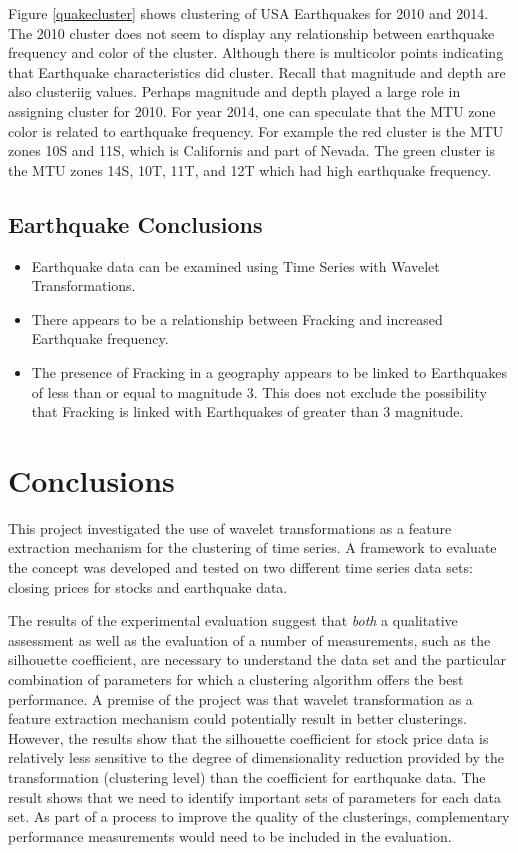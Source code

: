 \documentclass{article}
\begin{document}
Figure \ref{quakecluster} shows clustering of USA Earthquakes for 2010 and 2014.  The 2010 cluster does not seem to display any relationship between earthquake frequency and color of the cluster.
Although there is multicolor points indicating that Earthquake characteristics did cluster.  Recall that magnitude and depth are also clusteriig values.  Perhaps magnitude and depth played a large role in assigning cluster for 2010.
For year 2014, one can speculate that the MTU zone color is related to earthquake frequency.  For example the red cluster is the MTU zones 10S and 11S, which is Californis and part of Nevada.
The green cluster is the MTU zones 14S, 10T, 11T, and 12T which had high earthquake frequency.

\subsection{Earthquake Conclusions}

\begin{itemize}
\item Earthquake data can be examined using Time Series with Wavelet Transformations.
\item There appears to be a relationship between Fracking and increased Earthquake frequency.
\item The presence of Fracking in a geography appears to be linked to Earthquakes of less than or equal to  magnitude 3. This does not exclude the possibility that Fracking is linked with Earthquakes of  greater than 3 magnitude.
\end{itemize}


\section{Conclusions}

This project investigated the use of wavelet transformations as a feature extraction mechanism for the clustering of time series. A framework to evaluate the concept was developed and tested on two different time series data sets: closing prices for stocks and earthquake data.

The results of the experimental evaluation suggest that {\em both} a qualitative assessment as well as the evaluation of a number of measurements, such as the silhouette coefficient, are necessary to understand the data set and the particular combination of parameters for which a clustering algorithm offers the best performance. A premise of the project was that wavelet transformation as a feature extraction mechanism could potentially result in better clusterings. However, the results show that the silhouette coefficient for stock price data is relatively less sensitive to the degree of dimensionality reduction provided by the transformation (clustering level) than the coefficient for earthquake data. The result shows that we need to identify important sets of parameters for each data set. As part of a process to improve the quality of the clusterings, complementary performance measurements would need to be included in the evaluation.
\end{document}

